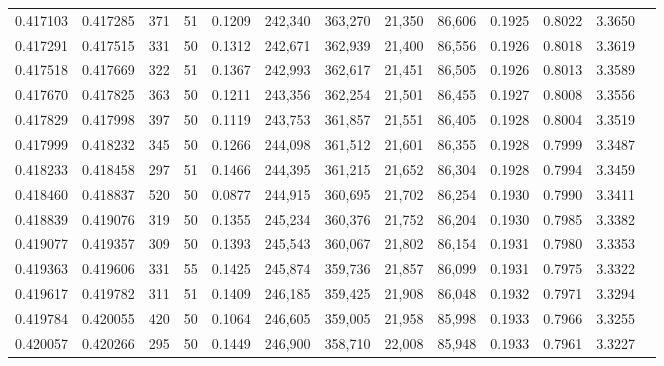\begin{tabular}{rrrrrrrrrrrrr}
0.417103 & 0.417285 &   371 &  51 &                                     0.1209 & 242,340 & 363,270 &  21,350 &  86,606 & 0.1925 & 0.8022 & 3.3650 \\
0.417291 & 0.417515 &   331 &  50 &                                     0.1312 & 242,671 & 362,939 &  21,400 &  86,556 & 0.1926 & 0.8018 & 3.3619 \\
0.417518 & 0.417669 &   322 &  51 &                                     0.1367 & 242,993 & 362,617 &  21,451 &  86,505 & 0.1926 & 0.8013 & 3.3589 \\
0.417670 & 0.417825 &   363 &  50 &                                     0.1211 & 243,356 & 362,254 &  21,501 &  86,455 & 0.1927 & 0.8008 & 3.3556 \\
0.417829 & 0.417998 &   397 &  50 &                                     0.1119 & 243,753 & 361,857 &  21,551 &  86,405 & 0.1928 & 0.8004 & 3.3519 \\
0.417999 & 0.418232 &   345 &  50 &                                     0.1266 & 244,098 & 361,512 &  21,601 &  86,355 & 0.1928 & 0.7999 & 3.3487 \\
0.418233 & 0.418458 &   297 &  51 &                                     0.1466 & 244,395 & 361,215 &  21,652 &  86,304 & 0.1928 & 0.7994 & 3.3459 \\
0.418460 & 0.418837 &   520 &  50 &                                     0.0877 & 244,915 & 360,695 &  21,702 &  86,254 & 0.1930 & 0.7990 & 3.3411 \\
0.418839 & 0.419076 &   319 &  50 &                                     0.1355 & 245,234 & 360,376 &  21,752 &  86,204 & 0.1930 & 0.7985 & 3.3382 \\
0.419077 & 0.419357 &   309 &  50 &                                     0.1393 & 245,543 & 360,067 &  21,802 &  86,154 & 0.1931 & 0.7980 & 3.3353 \\
0.419363 & 0.419606 &   331 &  55 &                                     0.1425 & 245,874 & 359,736 &  21,857 &  86,099 & 0.1931 & 0.7975 & 3.3322 \\
0.419617 & 0.419782 &   311 &  51 &                                     0.1409 & 246,185 & 359,425 &  21,908 &  86,048 & 0.1932 & 0.7971 & 3.3294 \\
0.419784 & 0.420055 &   420 &  50 &                                     0.1064 & 246,605 & 359,005 &  21,958 &  85,998 & 0.1933 & 0.7966 & 3.3255 \\
0.420057 & 0.420266 &   295 &  50 &                                     0.1449 & 246,900 & 358,710 &  22,008 &  85,948 & 0.1933 & 0.7961 & 3.3227 \\

\end{tabular}
